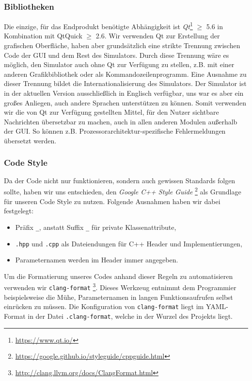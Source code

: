 \subsubsection{Bibliotheken}

Die einzige, für das Endprodukt benötigte Abhängigkeit ist
\emph{Qt}\footnote{\url{https://www.qt.io/}} $\geq$ 5.6 in Kombination mit
QtQuick $\geq$ 2.6. Wir verwenden Qt zur Erstellung der grafischen Oberfläche,
haben aber grundsätzlich eine strikte Trennung zwischen Code der GUI und dem
Rest des Simulators. Durch diese Trennung wäre es möglich, den Simulator auch
ohne Qt zur Verfügung zu stellen, z.B. mit einer anderen Grafikbibliothek oder
als Kommandozeilenprogramm.  Eine Ausnahme zu dieser Trennung bildet die
Internationalisierung des Simulators. Der Simulator ist in der aktuellen Version
ausschließlich in Englisch verfügbar, uns war es aber ein großes Anliegen, auch
andere Sprachen unterstützen zu können. Somit verwenden wir die von Qt zur
Verfügung gestellten Mittel, für den Nutzer sichtbare Nachrichten übersetzbar zu machen,
auch in allen anderen Modulen außerhalb der GUI. So können z.B.
Prozessorarchitektur-spezifische Fehlermeldungen übersetzt werden.

\subsubsection{Code Style}

Da der Code nicht nur funktionieren, sondern auch gewissen Standards folgen
sollte, haben wir uns entschieden, den \emph{Google C++ Style Guide}
\footnote{\url{https://google.github.io/styleguide/cppguide.html}} als Grundlage
für unseren Code Style zu nutzen. Folgende Ausnahmen haben wir dabei festgelegt:

\begin{itemize}
  \item Präfix \texttt{\_}, anstatt Suffix \texttt{\_} für private Klassenattribute,
  \item \texttt{.hpp} und \texttt{.cpp} als Dateiendungen für C++
  Header und Implementierungen,
  \item Parameternamen werden im Header immer angegeben.
\end{itemize}

Um die Formatierung unseres Codes anhand dieser Regeln zu automatisieren
verwenden wir \texttt{clang-format}
\footnote{\url{http://clang.llvm.org/docs/ClangFormat.html}}. Dieses Werkzeug
entnimmt dem Programmier beispielsweise die Mühe, Parameternamen in langen
Funktionsaufrufen selbst einrücken zu müssen. Die Konfiguration von
\texttt{clang-format} liegt im YAML-Format in der Datei \texttt{.clang-format},
welche in der Wurzel des Projekts liegt.
\vspace{0.3cm}

